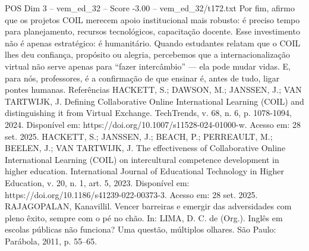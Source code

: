 \begin{textsample}{POS Dim 3 – vem\_ed\_32 – Score -3.00 – vem\_ed\_32/t172.txt}
Por fim, afirmo que os projetos COIL merecem apoio institucional mais robusto: é preciso tempo para planejamento, recursos tecnológicos, capacitação docente.
Esse investimento não é apenas estratégico: é humanitário.
Quando estudantes relatam que o COIL lhes deu confiança, propósito ou alegria, percebemos que a internacionalização virtual não serve apenas para “fazer intercâmbio” — ela pode mudar vidas.
E, para nós, professores, é a confirmação de que ensinar é, antes de tudo, ligar pontes humanas.
Referências HACKETT, S.; DAWSON, M.; JANSSEN, J.; VAN TARTWIJK, J.
Defining Collaborative Online International Learning (COIL) and distinguishing it from Virtual Exchange.
TechTrends, v. 68, n. 6, p. 1078-1094, 2024.
Disponível em: https://doi.org/10.1007/s11528-024-01000-w.
Acesso em: 28 set. 2025.
HACKETT, S.; JANSSEN, J.; BEACH, P.; PERREAULT, M.; BEELEN, J.; VAN TARTWIJK, J.
The effectiveness of Collaborative Online International Learning (COIL) on intercultural competence development in higher education.
International Journal of Educational Technology in Higher Education, v. 20, n. 1, art. 5, 2023.
Disponível em: https://doi.org/10.1186/s41239-022-00373-3.
Acesso em: 28 set. 2025.
RAJAGOPALAN, Kanavillil.
Vencer barreiras e emergir das adversidades com pleno êxito, sempre com o pé no chão.
In: LIMA, D.
C. de (Org.).
Inglês em escolas públicas não funciona?
Uma questão, múltiplos olhares.
São Paulo: Parábola, 2011, p. 55–65.

\end{textsample}
